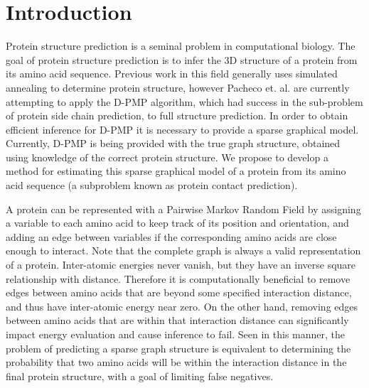 \documentclass{article}
\begin{document}
\section{Introduction}
\vspace*{-0.1in}
Protein structure prediction is a seminal problem in computational biology. The goal of protein structure prediction is to infer the 3D structure of a protein from its amino acid sequence. Previous work in this field generally uses simulated annealing to determine protein structure, however Pacheco et. al. are currently attempting to apply the D-PMP algorithm, which had success in the sub-problem of protein side chain prediction, to full structure prediction. In order to obtain efficient inference for D-PMP it is necessary to provide a sparse graphical model. Currently, D-PMP is being provided with the true graph structure, obtained using knowledge of the correct protein structure. We propose to develop a method for estimating this sparse graphical model of a protein from its amino acid sequence (a subproblem known as protein contact prediction).

A protein can be represented with a Pairwise Markov Random Field by assigning a variable to each amino acid to keep track of its position and orientation, and adding an edge between variables if the corresponding amino acids are close enough to interact. Note that the complete graph is always a valid representation of a protein. Inter-atomic energies never vanish, but they have an inverse square relationship with distance. Therefore it is computationally beneficial to remove edges between amino acids that are beyond some specified interaction distance, and thus have inter-atomic energy near zero. On the other hand, removing edges between amino acids that are within that interaction distance can significantly impact energy evaluation and cause inference to fail. Seen in this manner, the problem of predicting a sparse graph structure is equivalent to determining the probability that two amino acids will be within the interaction distance in the final protein structure, with a goal of limiting false negatives.
\vspace*{-0.1in}
\end{document}
